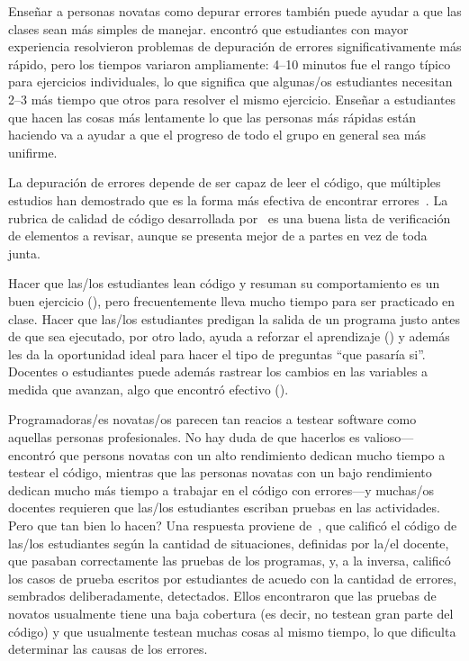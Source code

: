 Enseñar a personas novatas como depurar errores también puede ayudar a que las clases sean más simples de manejar.
\cite{Alqa2017} encontró que estudiantes con mayor experiencia resolvieron problemas de depuración de errores significativamente más rápido,
pero los tiempos variaron ampliamente:
4--10 minutos fue el rango típico para ejercicios individuales,
lo que significa que algunas/os estudiantes necesitan 2--3 más tiempo que otros para resolver el mismo ejercicio.
Enseñar a estudiantes que hacen las cosas más lentamente lo que las personas más rápidas están haciendo
va a ayudar a que el progreso de todo el grupo en general sea más unifirme.

La depuración de errores depende de ser capaz de leer el código,
que múltiples estudios han demostrado que es la forma más efectiva de encontrar errores~\cite{Basi1987,Keme2009,Bacc2013}.
La rubrica de calidad de código desarrollada por~\cite{Steg2014,Steg2016a}
es una buena lista de verificación de elementos a revisar,
aunque se presenta mejor de a partes en vez de toda junta.

Hacer que las/los estudiantes lean código y resuman su comportamiento es un buen ejercicio (),
pero frecuentemente lleva mucho tiempo para ser practicado en clase.
Hacer que las/los estudiantes predigan la salida de un programa justo antes de que sea ejecutado,
por otro lado,
ayuda a reforzar el aprendizaje ()
y además les da la oportunidad ideal para hacer el tipo de preguntas ``que pasaría si''.
Docentes o estudiantes puede además rastrear los cambios en las variables a medida que avanzan,
algo que \cite{Cunn2017} encontró efectivo ().


Programadoras/es novatas/os parecen tan reacios a testear software como aquellas personas profesionales.
No hay duda de que hacerlos es valioso---\cite{Cart2017} encontró que
persons novatas con un alto rendimiento dedican mucho tiempo a testear el código,
mientras que las personas novatas con un bajo rendimiento dedican mucho más tiempo a trabajar en el código con errores---y muchas/os docentes
requieren que las/los estudiantes escriban pruebas en las  actividades.
Pero que tan bien lo hacen?
Una respuesta proviene de~\cite{Bria2015},
que calificó el código de las/los estudiantes según la cantidad de situaciones, definidas por la/el docente, que pasaban correctamente las pruebas de los programas,
y, a la inversa, calificó los casos de prueba escritos por estudiantes de acuedo con la cantidad de errores, sembrados deliberadamente, detectados.
Ellos encontraron que las pruebas de novatos usualmente tiene una baja cobertura (es decir, no testean gran parte del código)
y que usualmente testean muchas cosas al mismo tiempo, lo que dificulta determinar las causas de los errores.

